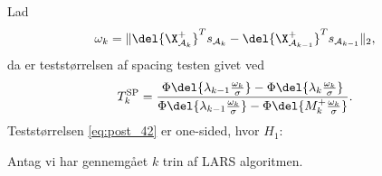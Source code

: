 Lad
\begin{align*}
\omega_k = \Vert \del{\X_{\mathcal{A}_k}^+}^T s_{\mathcal{A}_k} -   \del{\X_{\mathcal{A}_{k-1}}^+}^T s_{\mathcal{A}_{k-1}} \Vert_2,
\end{align*}
da er teststørrelsen af spacing testen givet ved
\begin{align}
T_k^{\text{SP}}= \frac{\Phi \del{\lambda_{k-1} \frac{\omega_k}{\sigma}} - \Phi \del{\lambda_{k} \frac{\omega_k}{\sigma}}}{\Phi \del{\lambda_{k-1} \frac{\omega_k}{\sigma}} - \Phi \del{M_{k}^+ \frac{\omega_k}{\sigma}}} \label{eq:post_42}.
\end{align}
Teststørrelsen \eqref{eq:post_42} er one-sided, hvor \(H_1: \)



\begin{thm}
Antag vi har gennemgået \(k\) trin af LARS algoritmen.

\end{thm}
